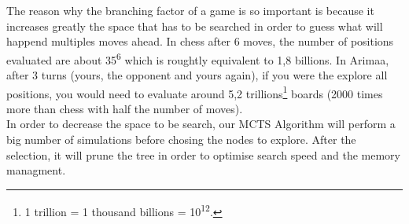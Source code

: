 \documentclass[12pt]{article}
\begin{document}
\bigskip
The reason why the branching factor of a game is so important is because it increases greatly the space that has to be searched in order to guess what will happend multiples moves ahead. In chess after 6 moves, the number of positions evaluated are about 35\textsuperscript{6} which is roughtly equivalent to 1,8 billions. In Arimaa, after 3 turns (yours, the opponent and yours again), if you were the explore all positions, you would need to evaluate around 5,2 trillions\footnote{1 trillion = 1 thousand billions = 10\textsuperscript{12}.} boards (2000 times more than chess with half the number of moves).
\bigskip\\
In order to decrease the space to be search, our MCTS Algorithm will perform a big number of simulations before chosing the nodes to explore. After the selection, it will prune the tree in order to optimise search speed and the memory managment.
\end{document}
